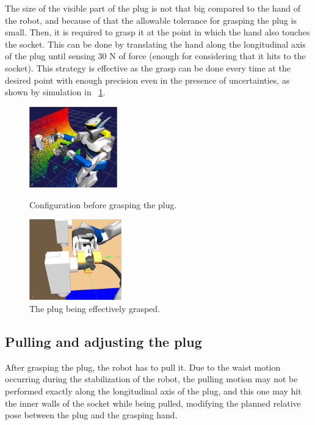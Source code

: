 		The size of the visible part of the plug is not that big compared to the hand of the robot,
		and because of that the allowable tolerance for grasping the plug is small.
		Then, it is required to grasp it at the point in which the hand also touches the socket.
		This can be done by translating the hand along the longitudinal axis of the plug until sensing
		30 N of force (enough for considering that it hits to the socket).
		This strategy is effective as the grasp can be done every time at the	desired point with enough
		precision even in the presence of uncertainties, as shown by simulation in
		\figurename~\ref{fig:GraspPlug}.
		
		\begin{figure}[t]
			\centering
			\begin{minipage}[t]{0.475\linewidth}
				\centering
				\includegraphics[height = 3.5cm]{img/PreCloseHand}
				\caption{Configuration before grasping the plug.}
				\label{fig:PreCloseHand}
			\end{minipage}
			\hspace{0.1cm}
			\begin{minipage}[t]{0.475\linewidth}
				\centering
				\includegraphics[height = 3.5cm]{img/GraspPlug}
				\caption{The plug being effectively grasped.}
				\label{fig:GraspPlug}
			\end{minipage}
		\end{figure}
		
	\subsection{Pulling and adjusting the plug}
		
		After grasping the plug, the robot has to pull it.
		Due to the waist motion occurring during the stabilization of the robot, the pulling motion may not
		be performed exactly along the longitudinal axis of the plug, and this one may hit the inner walls
		of the socket while being pulled, modifying the planned relative pose between the plug and the
		grasping hand.
		
